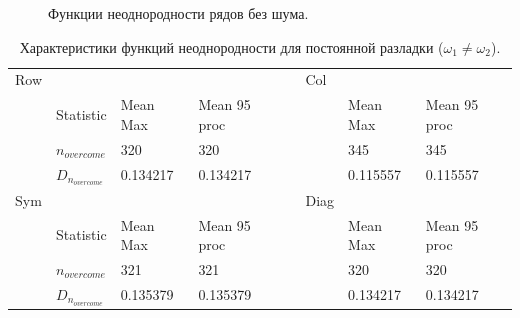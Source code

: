 \documentclass[specialist, substylefile = spbu.rtx,
			   subf, href, 12pt]{disser}
\begin{document}
\newpage
\begin{figure}[!hhh]
	\caption{Функции неоднородности рядов без шума.}
	\label{pic:HeterFuncsWithoutNoise}
\end{figure}


\newpage
\begin{table}[!hhh]
	\center
	\caption{Характеристики функций неоднородности для постоянной разладки ($\omega_1 \neq \omega_2$).}
	\small
	\begin{tabular}{llllllll}
		Row & 				   & 		  	  & 			 && Col & 		      & 			      \\
		& Statistic        & Mean Max 	  & Mean 95 proc && 	& Mean Max     & Mean 95 proc     \\
		& $n_{overcome}$   & 320   	  & 320      &&     & 345       & 345 		  \\
		&$D_{n_{overcome}}$& 0.134217		  &	0.134217	 &&     & 0.115557		  &   0.115557             \\
		Sym & 				   & 		  	  & 			 && Diag& 		      & 			      \\
		& Statistic        & Mean Max 	  & Mean 95 proc && 	& Mean Max     & Mean 95 proc     \\
		& $n_{overcome}$   & 321   	  & 321      &&     & 320      & 320		  \\
		&$D_{n_{overcome}}$& 0.135379		  &	0.135379		 &&     & 0.134217		 &0.134217                   \\
	\end{tabular}
	\label{tab:PermanentHeterogeneity}
\end{table}
\end{document}
